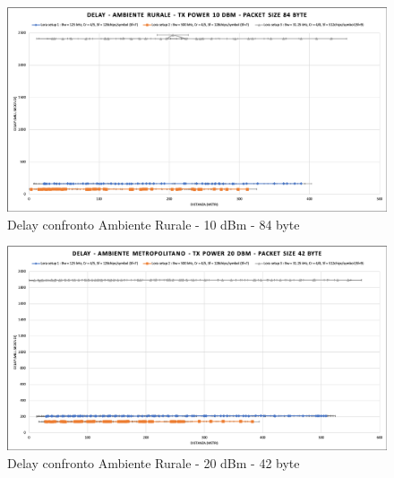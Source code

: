 \documentclass[12pt,a4paper,openright,twoside]{report}
\begin{document}
\begin{figure}[h]                      
\begin{center} 
\includegraphics[width=\textwidth]{DELAY_confronto_AM_10dBm_84byte.png}
\caption[Delay confronto Ambiente Rurale - 10 dBm - 84 byte]{Delay confronto Ambiente Rurale - 10 dBm - 84 byte}\label{fig:prima}
\end{center}
\end{figure}

\begin{figure}[h]                      
\begin{center} 
\includegraphics[width=\textwidth]{DELAY_confronto_AM_20dBm_42byte.png}
\caption[Delay confronto Ambiente Rurale - 20 dBm - 42 byte]{Delay confronto Ambiente Rurale - 20 dBm - 42 byte}\label{fig:prima}
\end{center}
\end{figure}
\end{document}
